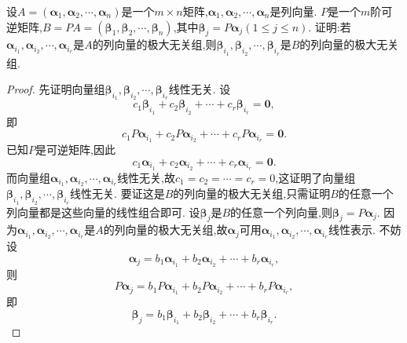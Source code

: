 \documentclass[../../main.tex]{subfiles}%
\begin{document}
\begin{proposition}\label{proposition:乘可逆矩阵不改变向量组的极大无关组的位置}
设\(A = (\boldsymbol{\alpha}_1,\boldsymbol{\alpha}_2,\cdots,\boldsymbol{\alpha}_n)\)是一个\(m\times n\)矩阵,\(\boldsymbol{\alpha}_1,\boldsymbol{\alpha}_2,\cdots,\boldsymbol{\alpha}_n\)是列向量. \(P\)是一个\(m\)阶可逆矩阵,\(B = PA=(\boldsymbol{\beta}_1,\boldsymbol{\beta}_2,\cdots,\boldsymbol{\beta}_n)\),其中\(\boldsymbol{\beta}_j = P\boldsymbol{\alpha}_j(1\leqslant  j\leqslant  n)\). 证明:若\(\boldsymbol{\alpha}_{i_1},\boldsymbol{\alpha}_{i_2},\cdots,\boldsymbol{\alpha}_{i_r}\)是\(A\)的列向量的极大无关组,则\(\boldsymbol{\beta}_{i_1},\boldsymbol{\beta}_{i_2},\cdots,\boldsymbol{\beta}_{i_r}\)是\(B\)的列向量的极大无关组.
\end{proposition}
\begin{proof}

先证明向量组\(\boldsymbol{\beta}_{i_1},\boldsymbol{\beta}_{i_2},\cdots,\boldsymbol{\beta}_{i_r}\)线性无关. 设
\[
c_1\boldsymbol{\beta}_{i_1}+c_2\boldsymbol{\beta}_{i_2}+\cdots + c_r\boldsymbol{\beta}_{i_r}=\boldsymbol{0},
\]
即
\[
c_1P\boldsymbol{\alpha}_{i_1}+c_2P\boldsymbol{\alpha}_{i_2}+\cdots + c_rP\boldsymbol{\alpha}_{i_r}=\boldsymbol{0}.
\]
已知\(P\)是可逆矩阵,因此
\[
c_1\boldsymbol{\alpha}_{i_1}+c_2\boldsymbol{\alpha}_{i_2}+\cdots + c_r\boldsymbol{\alpha}_{i_r}=\boldsymbol{0}.
\]
而向量组\(\boldsymbol{\alpha}_{i_1},\boldsymbol{\alpha}_{i_2},\cdots,\boldsymbol{\alpha}_{i_r}\)线性无关,故\(c_1 = c_2=\cdots = c_r = 0\),这证明了向量组\(\boldsymbol{\beta}_{i_1},\boldsymbol{\beta}_{i_2},\cdots,\boldsymbol{\beta}_{i_r}\)线性无关. 要证这是\(B\)的列向量的极大无关组,只需证明\(B\)的任意一个列向量都是这些向量的线性组合即可. 设\(\boldsymbol{\beta}_j\)是\(B\)的任意一个列向量,则\(\boldsymbol{\beta}_j = P\boldsymbol{\alpha}_j\). 因为\(\boldsymbol{\alpha}_{i_1},\boldsymbol{\alpha}_{i_2},\cdots,\boldsymbol{\alpha}_{i_r}\)是\(A\)的列向量的极大无关组,故\(\boldsymbol{\alpha}_j\)可用\(\boldsymbol{\alpha}_{i_1},\boldsymbol{\alpha}_{i_2},\cdots,\boldsymbol{\alpha}_{i_r}\)线性表示. 不妨设
\[
\boldsymbol{\alpha}_j = b_1\boldsymbol{\alpha}_{i_1}+b_2\boldsymbol{\alpha}_{i_2}+\cdots + b_r\boldsymbol{\alpha}_{i_r},
\]
则
\[
P\boldsymbol{\alpha}_j = b_1P\boldsymbol{\alpha}_{i_1}+b_2P\boldsymbol{\alpha}_{i_2}+\cdots + b_rP\boldsymbol{\alpha}_{i_r},
\]
即
\[
\boldsymbol{\beta}_j = b_1\boldsymbol{\beta}_{i_1}+b_2\boldsymbol{\beta}_{i_2}+\cdots + b_r\boldsymbol{\beta}_{i_r}.
\]

\end{proof}
\end{document}
